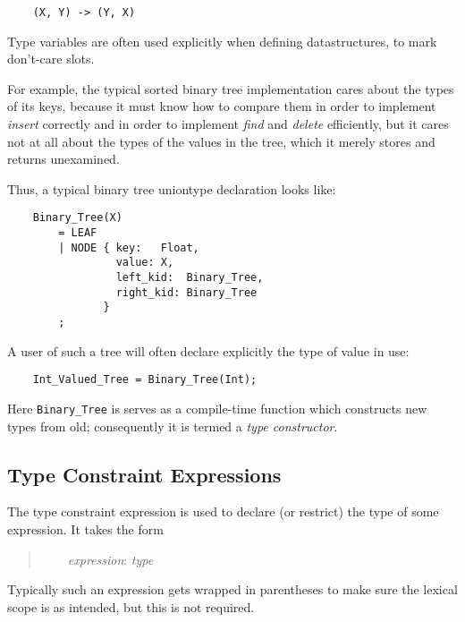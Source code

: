 \begin{verbatim}
    (X, Y) -> (Y, X)
\end{verbatim}

Type variables are often used explicitly when defining 
datastructures, to mark don't-care slots.

For example, the typical sorted binary tree implementation cares about 
the types of its keys, because it must know how to compare them in 
order to implement {\it insert} correctly and in order to implement 
{\it find} and {\it delete} efficiently, but it cares not at all about 
the types of the values in the tree, which it merely stores and 
returns unexamined.

Thus, a typical binary tree uniontype declaration looks like:

\begin{verbatim}
    Binary_Tree(X)
        = LEAF
        | NODE { key:   Float,
                 value: X,
                 left_kid:  Binary_Tree,
                 right_kid: Binary_Tree
               }
        ;
\end{verbatim}

A user of such a tree will often declare 
explicitly the type of value in use:

\begin{verbatim}
    Int_Valued_Tree = Binary_Tree(Int);
\end{verbatim}

Here {\tt Binary\_Tree} is serves as a compile-time function which  
constructs new types from old;  consequently it is termed a 
{\it type constructor}.

\cutend*


\subsection{Type Constraint Expressions}
\label{section:ref:types:type-constraint-expressions}

The type constraint expression is used to declare (or restrict) the type of some expression. 
It takes the form

\begin{quotation}
~~~~{\it expression}: {\it type}
\end{quotation}

Typically such an expression gets wrapped in parentheses to make sure 
the lexical scope is as intended, but this is not required.

